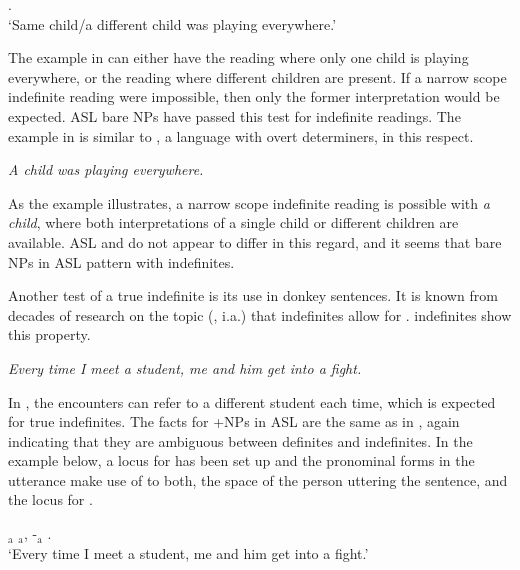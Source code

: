 \documentclass[output=paper,
modfonts
]{langscibook}
\begin{document}
\begin{exe} 
\ex \label{ex:irani:38} .\\
`Same child/a different child was playing everywhere.’
\end{exe} 

The example in  can either have the reading where only one child is playing everywhere, or the reading where different children are present. If a narrow scope indefinite reading were impossible, then only the former interpretation would be expected. ASL bare NPs have passed this test for indefinite readings. The example in  is similar to  , a language with overt determiners, in this respect. 

\begin{exe}
\ex \label{ex:irani:39} \textit{A child was playing everywhere.}
\end{exe}

As the  example illustrates, a narrow scope indefinite reading is possible with \textit{a child}, where both interpretations of a single child or different children are available. ASL and  do not appear to differ in this regard, and it seems that bare NPs in ASL pattern with  indefinites. 

Another test of a true indefinite is its use in donkey sentences. It is known from decades of research on the topic (\citealt{Geach1962,Lewis1975}, i.a.) that indefinites allow for .  indefinites show this property. 

\begin{exe}
\ex \label{ex:irani:40} \textit{Every time I meet a student, me and him get into a fight.}
\end{exe}

In , the encounters can refer to a different student each time, which is expected for true indefinites. The facts for +NPs in ASL are the same as in , again indicating that they are ambiguous between definites and indefinites. In the example below, a locus for  has been set up and the pronominal forms in the utterance make use of  to both, the space of the person uttering the sentence, and the locus for .

\begin{exe}
\ex \label{ex:irani:41}  $_\text{a}$ $_\text{a}$, -$_\text{a}$ .\\
`Every time I meet a student, me and him get into a fight.'
\end{exe}
\end{document}
